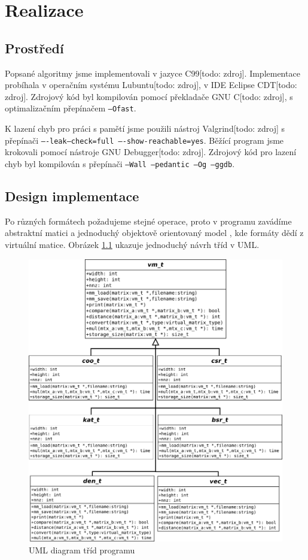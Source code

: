 \chapter{Realizace}

\section{Prostředí}

Popsané algoritmy jsme implementovali v jazyce C99[todo: zdroj]. Implementace probíhala v operačním systému Lubuntu[todo: zdroj], v IDE Eclipse CDT[todo: zdroj]. Zdrojový kód byl kompilován pomocí překladače GNU C[todo: zdroj], s optimalizačním přepínačem \texttt{--Ofast}.

K lazení chyb pro práci s pamětí jsme použili nástroj Valgrind[todo: zdroj] s přepínači \texttt{----leak--check=full ----show-reachable=yes}. Běžící program jsme krokovali pomocí nástroje GNU Debugger[todo: zdroj]. Zdrojový kód pro lazení chyb byl kompilován s přepínači \texttt{--Wall --pedantic --Og --ggdb}.


\section{Design implementace}

Po různých formátech požadujeme stejné operace, proto v programu zavádíme abstraktní matici a jednoduchý objektově orientovaný model \cite{schreiner1994objektorientierte}, kde formáty dědí z virtuální matice. Obrázek \ref{fig:uml} ukazuje jednoduchý návrh tříd v UML.
	
\begin{figure}[htb]
	\includegraphics[width=1.0\textwidth]{./images/uml/uml}
	\caption{UML diagram tříd programu}
	\label{fig:uml}
\end{figure}

